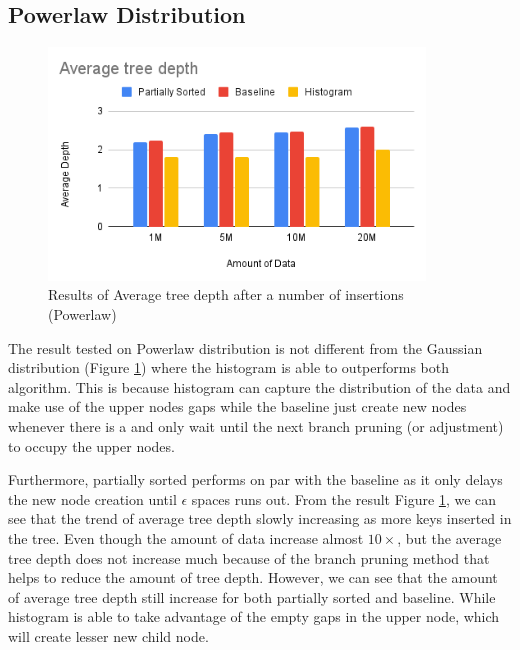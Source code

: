 \subsection{Powerlaw Distribution}
\begin{figure}[H]
    \centering
    \includegraphics[width=100mm,scale=1]{Figures/AVGTD-Pow.png}
    \caption{
     Results of Average tree depth after a number of insertions (Powerlaw)
    }
    \label{fig:AverageTreeDepthPow}
\end{figure}
The result tested on Powerlaw distribution is not different from the Gaussian distribution (Figure \ref{fig:AverageTreeDepthPow}) where the histogram is able to outperforms both algorithm. This is because histogram can capture the distribution of the data and make use of the upper nodes gaps while the baseline just create new nodes whenever there is a \conflict and only wait until the next branch pruning (or adjustment) to occupy the upper nodes. 


Furthermore, partially sorted performs on par with the baseline as it only delays the new node creation until $\epsilon$ spaces runs out. From the result Figure \ref{fig:AverageTreeDepthPow}, we can see that the trend of average tree depth slowly increasing as more keys inserted in the tree. Even though the amount of data increase almost $10\times$, but the average tree depth does not increase much because of the branch pruning method that helps to reduce the amount of tree depth. However, we can see that the amount of average tree depth still increase for both partially sorted and baseline. While histogram is able to take advantage of the empty gaps in the upper node, which will create lesser new child node.

